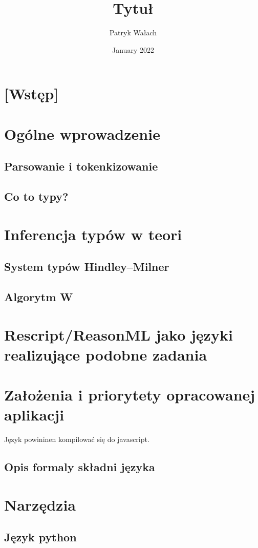\documentclass{article}
\title{Tytuł}
\author{Patryk Wałach}
\date{January 2022}
\begin{document}
\maketitle

\section{[Wstęp]}

\section{Ogólne wprowadzenie}
\subsection{Parsowanie i tokenkizowanie}
\subsection{Co to typy?}
\section{Inferencja typów w teori}
\subsection{System typów Hindley–Milner}
\subsection{Algorytm W}
\section{Rescript/ReasonML jako języki realizujące podobne zadania}
\section{Założenia i priorytety opracowanej aplikacji}
Język powininen kompilować się do javascript.
\subsection{Opis formaly składni języka}
\section{Narzędzia}
\subsection{Język python}
\end{document}
